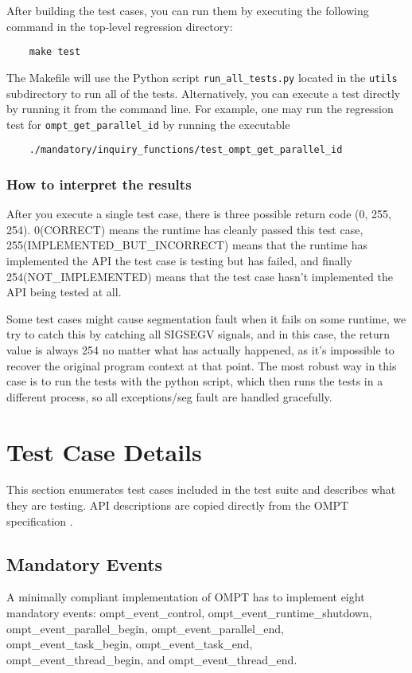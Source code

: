 \documentclass{article}
\begin{document}
    After building the test cases, you can run them by executing the following command in the top-level regression directory:
      \begin{verbatim}
    make test       
    \end{verbatim}
 The Makefile will use the Python script \verb|run_all_tests.py| located in the \verb|utils| subdirectory to run all of the tests.
 Alternatively, you can execute a test  directly by running it from the command line. For example, one may run the regression test for \verb|ompt_get_parallel_id| by running the executable 
\begin{verbatim}
    ./mandatory/inquiry_functions/test_ompt_get_parallel_id  
\end{verbatim}

    
    
\subsubsection{How to interpret the results}
    After you execute a single test case, there is three possible return code (0, 255, 254).
    0(CORRECT) means the runtime has cleanly passed this test case, 255(IMPLEMENTED\_BUT\_INCORRECT) means that the runtime has implemented the API the test case is testing but has failed, and finally 254(NOT\_IMPLEMENTED) means that the 
    test case hasn't implemented the API being tested at all.
    
    Some test cases might cause segmentation fault when it fails on some runtime, we try to catch this by 
    catching all SIGSEGV signals, and in this case, the return value is always 254 no matter what has actually happened, as 
    it's impossible to recover the original program context at that point. The most robust way in this case is to run the tests with 
    the python script, which then runs the tests in a different process, so all exceptions/seg fault are handled gracefully.
    
    
    
\section{Test Case Details}
This section enumerates test cases included in the test suite and describes what they are testing. 
API descriptions are copied directly from the OMPT specification \cite{MC2014}.

\subsection{Mandatory Events}
A minimally compliant implementation of OMPT has to implement eight mandatory events:
ompt\_event\_control,  ompt\_event\_runtime\_shutdown,  ompt\_event\_parallel\_begin,  ompt\_event\_parallel\_end, 
ompt\_event\_task\_begin, ompt\_event\_task\_end, \\ ompt\_event\_thread\_begin, and ompt\_event\_thread\_end.
\end{document}
